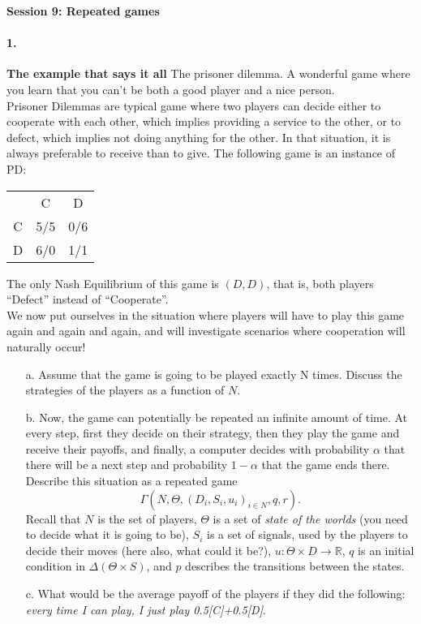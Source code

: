 \documentclass[a4paper,notitlepage,11pt]{article}
\newcommand{\reels}{\mathbb{R}}
\begin{document}
\setlength{\parindent}{0pt}
\setlength{\parskip}{1ex plus 0.5ex minus 0.2ex}

\Large

\textbf{Session 9: Repeated games}


\paragraph{1. } \textbf{The example that says it all}
The prisoner dilemma. A wonderful game where you learn that you can't be both a good player and a nice person.  \\
Prisoner Dilemmas are typical game where two players can decide either to cooperate with each other, which implies providing a service to the other, or to defect, which implies not doing anything for the other. In that situation, it is always preferable to receive than to give. The following game is an instance of PD:
\begin{center}
\begin{tabular}{c|cc}
& C & D \\
C & 5/5 & 0/6 \\
D & 6/0 & 1/1
\end{tabular}
\end{center}
The only Nash Equilibrium of this game is $(D,D)$, that is, both players ``Defect'' instead of ``Cooperate''.\\
We now put ourselves in the situation where players will have to play this game again and again and again, and will investigate scenarios where cooperation will naturally occur!
\begin{enumerate}
	\item[a.] Assume that the game is going to be played exactly N times. Discuss the strategies of the players as a function of $N$. 
	\item[b.] Now, the game can potentially be repeated an infinite amount of time. At every step, first they decide on their strategy, then they play the game and receive their payoffs, and finally, a computer decides with probability $\alpha$ that there will be a next step and probability $1-\alpha$ that the game ends there.\\
	Describe this situation as a repeated game $$\Gamma(N, \Theta, (D_i, S_i, u_i)_{i \in N}, q, r).$$
	Recall that $N$ is the set of players, $\Theta$ is a set of \emph{state of the worlds} (you need to decide what it is going to be), $S_i$ is a set of signals, used by the players to decide their moves (here also, what could it be?), $u : \Theta \times D \rightarrow \reels$, $q$ is an initial condition in $\Delta( \Theta \times S)$, and $p$ describes the transitions between the states.
		\item[c.] What would be the average payoff of the players if they did the following:
		\emph{every time I can play, I just play 0.5[C]+0.5[D]}. 
\end{enumerate}
\end{document}

